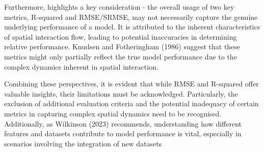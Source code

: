         Furthermore, \cite{wilkinsonSpatialInteractionModels2023} highlights a key consideration - the overall usage of two key metrics, R-squared and RMSE/SRMSE, may not necessarily capture the genuine underlying performance of a model. It is attributed to the inherent characteristics of spatial interaction flow, leading to potential inaccuracies in determining relative performance. Knudsen and Fotheringham (1986) suggest that these metrics might only partially reflect the true model performance due to the complex dynamics inherent in spatial interaction.
        
        Combining these perspectives, it is evident that while RMSE and R-squared offer valuable insights, their limitations must be acknowledged. Particularly, the exclusion of additional evaluation criteria and the potential inadequacy of certain metrics in capturing complex spatial dynamics need to be recognised. Additionally, as Wilkinson (2023) recommends, understanding how different features and datasets contribute to model performance is vital, especially in scenarios involving the integration of new datasets
        






